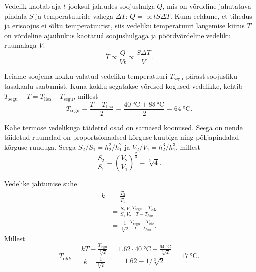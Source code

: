 \documentclass[10pt]{article}
\begin{document}

\solu
Vedelik kaotab aja $t$ jooksul jahtudes soojushulga $Q$, mis on võrdeline jahutatava pindala $S$ ja temperatuuride vahega $\Delta T$: $Q = \propto  t S \Delta T$. Kuna eeldame, et tihedus ja erisoojus ei sõltu temperatuurist, siis vedeliku temperatuuri langemise kiirus $\dot{T}$ on võrdeline ajaühukus kaotatud soojushulgaga ja pöördvõrdeline vedeliku ruumalaga $V$:
\[
\dot{T} \propto \frac{Q}{Vt} \propto \frac{S \Delta T}{V}.
\]

Leiame soojema kokku valatud vedeliku temperatuuri $T_\text{segu}$ pärast soojusliku tasakaalu saabumist. Kuna kokku segatakse võrdsed kogused vedelikke, kehtib $T_\text{segu}-T = T_\text{lisa}-T_\text{segu}$, millest
\[
  T_\text{segu} = \frac{T+T_\text{lisa}}{2} = \frac{\SI{40}{\celsius}+\SI{88}{\celsius}}{2}=\SI{64}{\celsius}.
  \]

Kahe termose vedelikuga täidetud osad on sarnased koonused. Seega on nende täidetud ruumalad on proportsionaalsed kõrguse kuubiga ning põhjapindalad kõrguse ruuduga. Seega $S_2/S_1=h_2^2/h_1^2$ ja $V_2/V_1=h_2^3/h_1^3$, millest
\[
  \frac{S_2}{S_1}=\left(\frac{V_2}{V_1}\right)^{\frac{2}{3}} = \sqrt[3]{4}.
\]

Vedelike jahtumise suhe
\begin{align*}
  k &= \frac{\dot{T_2}}{\dot{T_1}} \\
  &= \frac{S_2}{S_1} \frac{V_1}{V_2} \frac{T_\text{segu} - T_\text{õhk}}{T - T_\text{õhk}} \\
    &= \frac{1}{\sqrt[3]{2}}\frac{T_\text{segu} - T_\text{õhk}}{T - T_\text{õhk}}.
\end{align*}
Millest
\[
    T_{õhk} = \frac{k T - \frac{T_\text{segu}}{\sqrt[3]{2}}}{k - \frac{1}{\sqrt[3]{2}}} = \frac{\num{1.62} \cdot \SI{40}{\celsius} - \frac{\SI{64}{\celsius}}{\sqrt[3]{2}}}{\num{1.62} - 1/\sqrt[3]{2}} = \SI{17}{\celsius}.
\]
\probend
\bigskip

\end{document}
